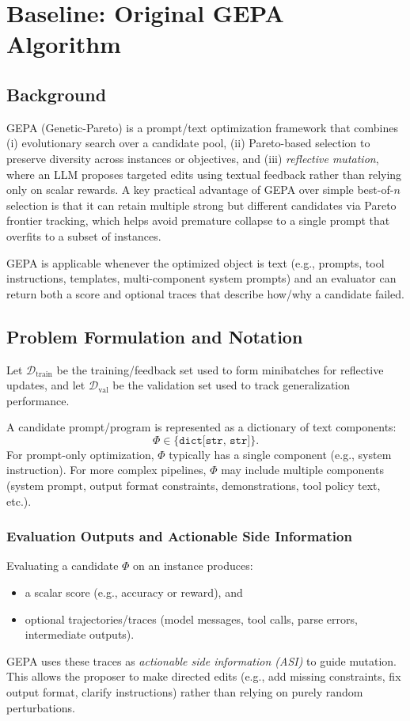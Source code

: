 \chapter{Baseline: Original GEPA Algorithm}
\label{ch:gepa_baseline}

\section{Background}
GEPA (Genetic-Pareto) is a prompt/text optimization framework that combines (i) evolutionary search over a candidate pool, (ii) Pareto-based selection to preserve diversity across instances or objectives, and (iii) \emph{reflective mutation}, where an LLM proposes targeted edits using textual feedback rather than relying only on scalar rewards. A key practical advantage of GEPA over simple best-of-$n$ selection is that it can retain multiple strong but different candidates via Pareto frontier tracking, which helps avoid premature collapse to a single prompt that overfits to a subset of instances. \citep{agrawal2025gepa,gepa_repo}

GEPA is applicable whenever the optimized object is text (e.g., prompts, tool instructions, templates, multi-component system prompts) and an evaluator can return both a score and optional traces that describe how/why a candidate failed.

\section{Problem Formulation and Notation}
Let $\mathcal{D}_{\text{train}}$ be the training/feedback set used to form minibatches for reflective updates, and let $\mathcal{D}_{\text{val}}$ be the validation set used to track generalization performance. \citep{gepa_repo}

A candidate prompt/program is represented as a dictionary of text components:
\[
\Phi \in \{\texttt{dict[str, str]}\}.
\]
For prompt-only optimization, $\Phi$ typically has a single component (e.g., system instruction). For more complex pipelines, $\Phi$ may include multiple components (system prompt, output format constraints, demonstrations, tool policy text, etc.).

\subsection{Evaluation Outputs and Actionable Side Information}
Evaluating a candidate $\Phi$ on an instance produces:
\begin{itemize}
    \item a scalar score (e.g., accuracy or reward), and
    \item optional trajectories/traces (model messages, tool calls, parse errors, intermediate outputs).
\end{itemize}
GEPA uses these traces as \emph{actionable side information (ASI)} to guide mutation. This allows the proposer to make directed edits (e.g., add missing constraints, fix output format, clarify instructions) rather than relying on purely random perturbations. \citep{gepa_repo}

